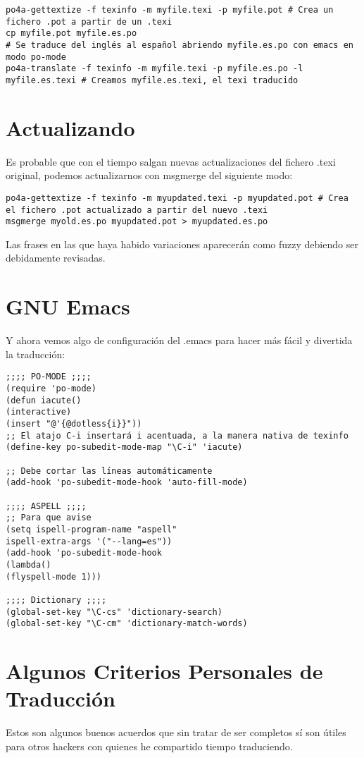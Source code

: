\documentclass[11pt]{article}
\begin{document}
\begin{verbatim}
po4a-gettextize -f texinfo -m myfile.texi -p myfile.pot # Crea un fichero .pot a partir de un .texi
cp myfile.pot myfile.es.po
# Se traduce del inglés al español abriendo myfile.es.po con emacs en modo po-mode
po4a-translate -f texinfo -m myfile.texi -p myfile.es.po -l myfile.es.texi # Creamos myfile.es.texi, el texi traducido
\end{verbatim}

\section{Actualizando}
\label{sec-3}

Es probable que con el tiempo salgan nuevas actualizaciones del fichero .texi original, podemos actualizarnos con msgmerge del siguiente modo:

\begin{verbatim}
po4a-gettextize -f texinfo -m myupdated.texi -p myupdated.pot # Crea el fichero .pot actualizado a partir del nuevo .texi
msgmerge myold.es.po myupdated.pot > myupdated.es.po
\end{verbatim}

Las frases en las que haya habido variaciones aparecerán como fuzzy debiendo ser debidamente revisadas.

\section{GNU Emacs}
\label{sec-4}

Y ahora vemos algo de configuración del .emacs para hacer más fácil y divertida la traducción:

\begin{verbatim}
;;;; PO-MODE ;;;;
(require 'po-mode)
(defun iacute()
(interactive)
(insert "@'{@dotless{i}}"))
;; El atajo C-i insertará i acentuada, a la manera nativa de texinfo
(define-key po-subedit-mode-map "\C-i" 'iacute)

;; Debe cortar las líneas automáticamente
(add-hook 'po-subedit-mode-hook 'auto-fill-mode)

;;;; ASPELL ;;;;
;; Para que avise
(setq ispell-program-name "aspell"
ispell-extra-args '("--lang=es"))
(add-hook 'po-subedit-mode-hook
(lambda()
(flyspell-mode 1)))

;;;; Dictionary ;;;;
(global-set-key "\C-cs" 'dictionary-search)
(global-set-key "\C-cm" 'dictionary-match-words)
\end{verbatim}
\section{Algunos Criterios Personales de Traducción}
\label{sec-5}
Estos son algunos buenos acuerdos que sin tratar de ser completos sí
son útiles para otros hackers con quienes he compartido tiempo traduciendo.
\end{document}

